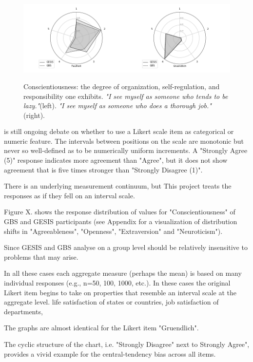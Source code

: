 \begin{figure}[H]
	\begin{center}
		\includegraphics[scale=0.52,angle=0]{fig/Conscientiousness_figure}
		\label{Conscientiousness}
		\caption{Conscientiousness: the degree of organization, self-regulation, and responsibility one exhibits. \textit{"I see myself as someone who tends to be lazy."}(left). \textit{"I see myself as someone who does a thorough job."}(right).}
	\end{center}
\end{figure}

 is still ongoing debate on whether to use a Likert scale item as categorical or numeric feature. The intervals between positions on the scale are monotonic but never so well-defined as to be numerically uniform increments. A "Strongly Agree (5)" response indicates more agreement than "Agree", but it does not show agreement that is five times stronger than "Strongly Disagree (1)". 

There is an underlying measurement continuum, but  
This project treats the responses as if they fell on an interval scale.

Figure X. shows the response distribution of values for "Conscientiousness" of GBS and GESIS participants (see Appendix for a visualization of distribution shifts in "Agreeableness", "Openness", "Extraversion" and "Neuroticism").

Since GESIS and GBS analyse  on a group level should be relatively insensitive to problems that may arise.

In all these cases each aggregate measure (perhaps the mean) is based on many individual responses (e.g., n=50, 100, 1000, etc.). In these cases the original Likert item begins to take on properties that resemble an interval scale at the aggregate level.
life satisfaction of states or countries,
job satisfaction of departments,

The graphs are almost identical for the Likert item "Gruendlich". 

The cyclic structure of the chart, i.e. "Strongly Disagree" next to Strongly Agree", provides a vivid example for the central-tendency bias across all items.

